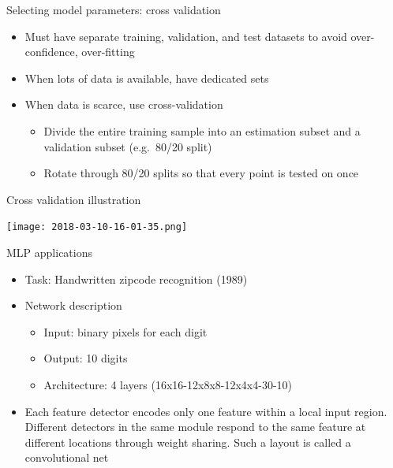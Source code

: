 \documentclass[notes]{beamer}
\providecommand{\tightlist}{%
  \setlength{\itemsep}{0pt}\setlength{\parskip}{0pt}}
\begin{document}
\begin{frame}{Selecting model parameters: cross validation}

\begin{itemize}
\tightlist
\item
  Must have separate training, validation, and test datasets to avoid
  over-confidence, over-fitting
\item
  When lots of data is available, have dedicated sets
\item
  When data is scarce, use cross-validation

  \begin{itemize}
  \tightlist
  \item
    Divide the entire training sample into an estimation subset and a
    validation subset (e.g.~80/20 split)
  \item
    Rotate through 80/20 splits so that every point is tested on once
  \end{itemize}
\end{itemize}

\end{frame}

\begin{frame}{Cross validation illustration}

\centering 

\texttt{[image: 2018-03-10-16-01-35.png]} ~

\end{frame}

\begin{frame}{MLP applications}

\begin{itemize}
\tightlist
\item
  Task: Handwritten zipcode recognition (1989)
\item
  Network description

  \begin{itemize}
  \tightlist
  \item
    Input: binary pixels for each digit
  \item
    Output: 10 digits
  \item
    Architecture: 4 layers (16x16-12x8x8-12x4x4-30-10)
  \end{itemize}
\item
  Each feature detector encodes only one feature within a local input
  region. Different detectors in the same module respond to the same
  feature at different locations through weight sharing. Such a layout
  is called a convolutional net
\end{itemize}

\end{frame}
\end{document}

